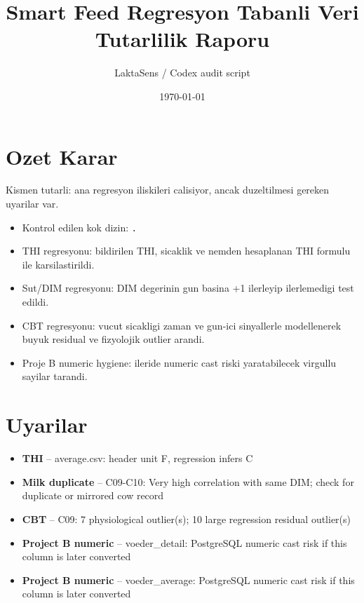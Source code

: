 \documentclass[11pt]{article}
\title{Smart Feed Regresyon Tabanli Veri Tutarlilik Raporu}
\author{LaktaSens / Codex audit script}
\date{\today}
\begin{document}
\maketitle

\section*{Ozet Karar}
Kismen tutarli: ana regresyon iliskileri calisiyor, ancak duzeltilmesi gereken uyarilar var.

\begin{itemize}
\item Kontrol edilen kok dizin: \texttt{.}
\item THI regresyonu: bildirilen THI, sicaklik ve nemden hesaplanan THI formulu ile karsilastirildi.
\item Sut/DIM regresyonu: DIM degerinin gun basina +1 ilerleyip ilerlemedigi test edildi.
\item CBT regresyonu: vucut sicakligi zaman ve gun-ici sinyallerle modellenerek buyuk residual ve fizyolojik outlier arandi.
\item Proje B numeric hygiene: ileride numeric cast riski yaratabilecek virgullu sayilar tarandi.
\end{itemize}

\section*{Uyarilar}
\begin{itemize}
\item \textbf{THI} -- average.csv: header unit F, regression infers C
\item \textbf{Milk duplicate} -- C09-C10: Very high correlation with same DIM; check for duplicate or mirrored cow record
\item \textbf{CBT} -- C09: 7 physiological outlier(s); 10 large regression residual outlier(s)
\item \textbf{Project B numeric} -- voeder\_detail: PostgreSQL numeric cast risk if this column is later converted
\item \textbf{Project B numeric} -- voeder\_average: PostgreSQL numeric cast risk if this column is later converted
\end{itemize}
\end{document}
